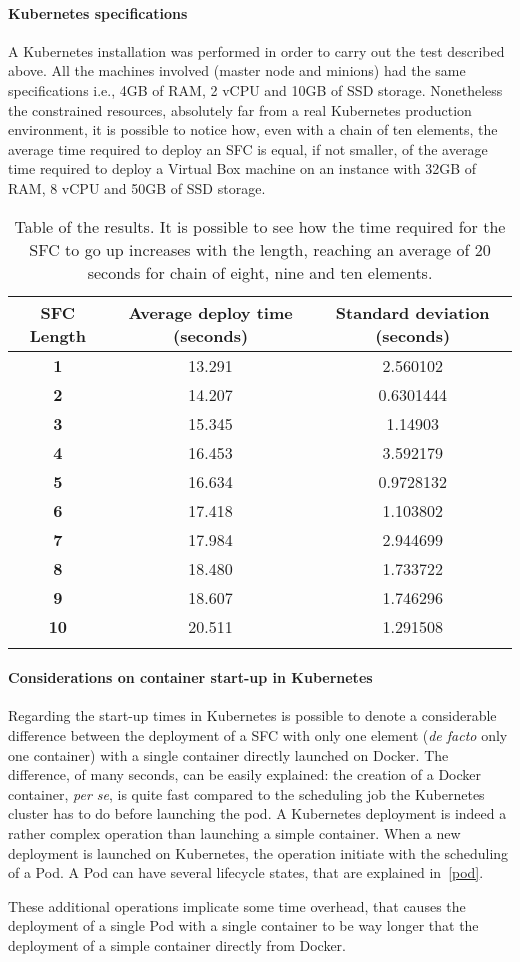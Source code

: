 \paragraph*{Kubernetes specifications}
A Kubernetes installation was performed in order to carry out the test
described above. All the machines involved (master node and minions) had the
same specifications i.e., 4GB of RAM, 2 vCPU and 10GB of SSD storage.
Nonetheless the constrained resources, absolutely far from a real Kubernetes
production environment, it is possible to notice how, even with a chain of ten
elements, the average time required to deploy an SFC is equal, if not smaller,
of the average time required to deploy a Virtual Box machine on an instance 
with 32GB of RAM, 8 vCPU and 50GB of SSD storage.

\newpage

\begin{longtable}[c]{c|c|c}
\textbf{SFC Length} & \textbf{Average deploy time (seconds)} & \textbf{Standard deviation (seconds)} \\ \hline
\endfirsthead
%
\endhead
%
\textbf{1} & 13.291 & 2.560102 \\
\textbf{2} & 14.207 & 0.6301444 \\
\textbf{3} & 15.345 & 1.14903 \\
\textbf{4} & 16.453 & 3.592179 \\
\textbf{5} & 16.634 & 0.9728132 \\
\textbf{6} & 17.418 & 1.103802 \\
\textbf{7} & 17.984 & 2.944699 \\
\textbf{8} & 18.480 & 1.733722 \\
\textbf{9} & 18.607 & 1.746296 \\
\textbf{10} & 20.511 & 1.291508 \\
\caption[SFC start up time]{Table of the results. It is possible to see how the
  time required for the SFC to go up increases with the length, reaching an
  average of 20 seconds for chain of eight, nine and ten elements.}
\label{chap:tests:sec:sfclength:tab:sfcdata}\\
\end{longtable}

\paragraph*{Considerations on container start-up in Kubernetes}
Regarding the start-up times in Kubernetes is possible to denote a considerable
difference between the deployment of a SFC with only one element
(\textit{de facto} only one container) with a single container directly launched
on Docker. The difference, of many seconds, can be easily explained: the
creation of a Docker container, \textit{per se}, is quite fast compared to the
scheduling job the Kubernetes cluster has to do before launching the pod. A
Kubernetes deployment is indeed a rather complex operation than launching a
simple container. When a new deployment is launched on Kubernetes, the operation
initiate with the scheduling of a Pod. A Pod can have several lifecycle
states, that are explained in~\ref{pod}.

These additional operations implicate some time overhead, that causes the
deployment of a single Pod with a single container to be way longer that the
deployment of a simple container directly from Docker.
